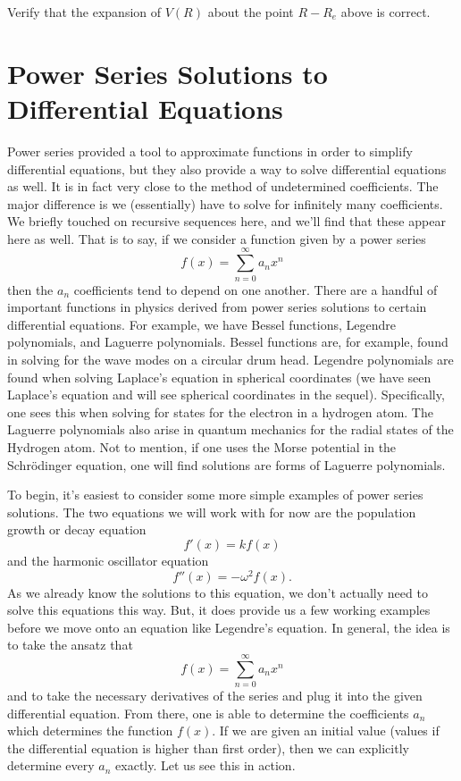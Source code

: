 \begin{exercise}
Verify that the expansion of $V(R)$ about the point $R-R_e$ above is correct.
\end{exercise}

\section{Power Series Solutions to Differential Equations}

Power series provided a tool to approximate functions in order to simplify differential equations, but they also provide a way to solve differential equations as well.  It is in fact very close to the method of undetermined coefficients. The major difference is we (essentially) have to solve for infinitely many coefficients.  We briefly touched on recursive sequences here, and we'll find that these appear here as well. That is to say, if we consider a function given by a power series
\[
f(x) = \sum_{n=0}^\infty a_n x^n
\]
then the $a_n$ coefficients tend to depend on one another.  There are a handful of important functions in physics derived from power series solutions to certain differential equations.  For example, we have Bessel functions, Legendre polynomials, and Laguerre polynomials.  Bessel functions are, for example, found in solving for the wave modes on a circular drum head.  Legendre polynomials are found when solving Laplace's equation in spherical coordinates (we have seen Laplace's equation and will see spherical coordinates in the sequel). Specifically, one sees this when solving for states for the electron in a hydrogen atom.  The Laguerre polynomials also arise in quantum mechanics for the radial states of the Hydrogen atom. Not to mention, if one uses the Morse potential in the Schr\"odinger equation, one will find solutions are forms of Laguerre polynomials.  

To begin, it's easiest to consider some more simple examples of power series solutions.  The two equations we will work with for now are the population growth or decay equation
\[
f'(x)=kf(x)
\]
and the harmonic oscillator equation
\[
f''(x)=-\omega^2 f(x).
\]
As we already know the solutions to this equation, we don't actually need to solve this equations this way.  But, it does provide us a few working examples before we move onto an equation like Legendre's equation. In general, the idea is to take the ansatz that 
\[
f(x) = \sum_{n=0}^\infty a_n x^n
\]
and to take the necessary derivatives of the series and plug it into the given differential equation.  From there, one is able to determine the coefficients $a_n$ which determines the function $f(x)$.  If we are given an initial value (values if the differential equation is higher than first order), then we can explicitly determine every $a_n$ exactly.  Let us see this in action.


